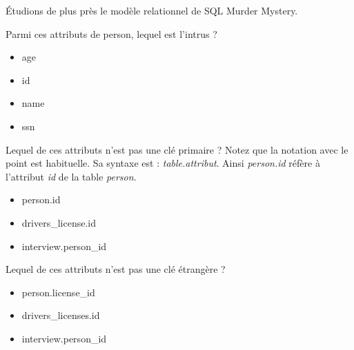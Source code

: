 Étudions de plus près le modèle relationnel de SQL Murder Mystery.\\[-1cm]
\begin{Quizz}
Parmi ces attributs de person, lequel est l'intrus ?
\begin{itemize}
    \renewcommand{\labelitemi}{$\square$}
    \item age
    \item id
    \item name
    \item ssn
\end{itemize}
\end{Quizz}
\begin{Quizz}
Lequel de ces attributs n'est pas une clé primaire ? Notez que la notation avec le point est habituelle. Sa syntaxe est : \textit{table.attribut}. Ainsi \textit{person.id} réfère à l'attribut \textit{id} de la table \textit{person}.
\begin{itemize}
    \renewcommand{\labelitemi}{$\square$}
    \item person.id
    \item drivers\_license.id
    \item interview.person\_id
\end{itemize}
\end{Quizz}
\begin{Quizz}
Lequel de ces attributs n'est pas une clé étrangère ?
\begin{itemize}
    \renewcommand{\labelitemi}{$\square$}
    \item person.license\_id
    \item drivers\_licenses.id
    \item interview.person\_id
\end{itemize}
\end{Quizz}


